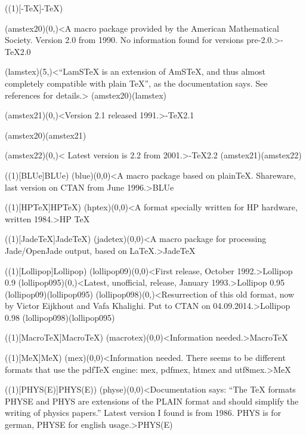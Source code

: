 \clearpage
\tograph(\tostruct(1)[\texorpdfstring{\AMS}{AMS}-\TeX]{\AMS-\TeX}){
	\tonode(amstex20)(0,\layer)<A macro package provided by the American Mathematical Society. Version 2.0 from 1990. No information found for versions pre-2.0.>{\AMS-\TeX  2.0}
	\steplayer[-1]

	\tonode(lamstex)(5,\layer)<“LamSTeX{} is an extension of AmSTeX, and thus almost completely compatible with plain TeX”, as the documentation says. See references for details.>{}
	\todraw(amstex20)(lamstex)
	\steplayer[-1]

	\tonode(amstex21)(0,\layer)<Version 2.1 released 1991.>{\AMS-\TeX  2.1}

	\todraw(amstex20)(amstex21)
	\steplayer[-2]

	\tonode(amstex22)(0,\layer)< Latest version is 2.2 from 2001.>{\AMS-\TeX 2.2}
	\todraw(amstex21)(amstex22)
}

\tograph(\tostruct(1)[BLUe]{BLUe}){
	\tonode(blue)(0,0)<A macro package based on plainTeX. Shareware, last version on CTAN from June 1996.>{BLUe}
}

\tograph(\tostruct(1)[HP\TeX]{HP\TeX}){
	\tonode(hptex)(0,0)<A format specially written for HP hardware, written 1984.>{HP \TeX}
}

\tograph(\tostruct(1)[Jade\TeX]{Jade\TeX}){
	\tonode(jadetex)(0,0)<A macro package for processing Jade/OpenJade output, based on LaTeX.>{Jade\TeX}
}

\tograph(\tostruct(1)[Lollipop]{Lollipop}){
	\tonode(lollipop09)(0,0)<First release, October 1992.>{Lollipop 0.9}
	\steplayer[-2]
	\tonode(lollipop095)(0,\layer)<Latest, unofficial, release, January 1993.>{Lollipop 0.95}
	\todraw(lollipop09)(lollipop095)
	\steplayer[-2]
	\tonode(lollipop098)(0,\layer)<Resurrection of this old format, now by Victor Eijkhout and Vafa Khalighi. Put to CTAN on 04.09.2014.>{Lollipop 0.98}
	\todraw(lollipop098)(lollipop095)
}

\tograph(\tostruct(1)[Macro\TeX]{Macro\TeX}){
	\tonode(macrotex)(0,0)<Information needed.>{Macro\TeX}
}

\tograph(\tostruct(1)[MeX]{MeX}){
	\tonode(mex)(0,0)<Information needed. There seems to be different formats that use the pdfTeX engine: mex, pdfmex, htmex and utf8mex.>{MeX}
}

\tograph(\tostruct(1)[PHYS(E)]{PHYS(E)}){
	\tonode(physe)(0,0)<Documentation says: “The TeX formats PHYSE and PHYS are extensions of the PLAIN format
and should simplify the writing of physics papers.” Latest version I found is from 1986. PHYS is for german, PHYSE for english usage.>{PHYS(E)}
}

